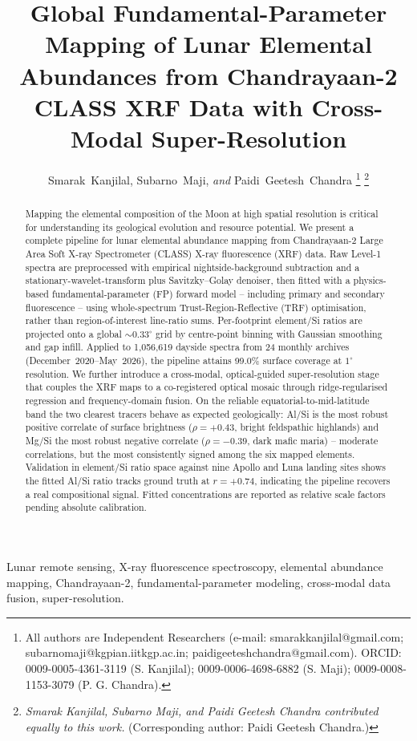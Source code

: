 \documentclass[journal,lettersize]{IEEEtran}
\title{Global Fundamental-Parameter Mapping of Lunar Elemental Abundances from Chandrayaan-2 CLASS XRF Data with Cross-Modal Super-Resolution}
\author{Smarak~Kanjilal, Subarno~Maji, \emph{and} Paidi~Geetesh~Chandra%
\thanks{All authors are Independent Researchers (e-mail: smarakkanjilal@gmail.com; subarnomaji@kgpian.iitkgp.ac.in; paidigeeteshchandra@gmail.com). ORCID: 0009-0005-4361-3119 (S. Kanjilal); 0009-0006-4698-6882 (S. Maji); 0009-0008-1153-3079 (P. G. Chandra).}%
\thanks{\textit{Smarak Kanjilal, Subarno Maji, and Paidi Geetesh Chandra contributed equally to this work.} (Corresponding author: Paidi Geetesh Chandra.)}}
\begin{document}
\maketitle

\begin{abstract}
Mapping the elemental composition of the Moon at high spatial resolution is critical for understanding its geological evolution and resource potential. We present a complete pipeline for lunar elemental abundance mapping from Chandrayaan-2 Large Area Soft X-ray Spectrometer (CLASS) X-ray fluorescence (XRF) data. Raw Level-1 spectra are preprocessed with empirical nightside-background subtraction and a stationary-wavelet-transform plus Savitzky--Golay denoiser, then fitted with a physics-based fundamental-parameter (FP) forward model -- including primary and secondary fluorescence -- using whole-spectrum Trust-Region-Reflective (TRF) optimisation, rather than region-of-interest line-ratio sums. Per-footprint element/Si ratios are projected onto a global $\sim0.33^{\circ}$ grid by centre-point binning with Gaussian smoothing and gap infill. Applied to 1{,}056{,}619 dayside spectra from 24 monthly archives (December~2020--May~2026), the pipeline attains 99.0\% surface coverage at $1^{\circ}$ resolution. We further introduce a cross-modal, optical-guided super-resolution stage that couples the XRF maps to a co-registered optical mosaic through ridge-regularised regression and frequency-domain fusion. On the reliable equatorial-to-mid-latitude band the two clearest tracers behave as expected geologically: Al/Si is the most robust positive correlate of surface brightness ($\rho=+0.43$, bright feldspathic highlands) and Mg/Si the most robust negative correlate ($\rho=-0.39$, dark mafic maria) -- moderate correlations, but the most consistently signed among the six mapped elements. Validation in element/Si ratio space against nine Apollo and Luna landing sites shows the fitted Al/Si ratio tracks ground truth at $r=+0.74$, indicating the pipeline recovers a real compositional signal. Fitted concentrations are reported as relative scale factors pending absolute calibration.
\end{abstract}

\begin{IEEEkeywords}
Lunar remote sensing, X-ray fluorescence spectroscopy, elemental abundance mapping, Chandrayaan-2, fundamental-parameter modeling, cross-modal data fusion, super-resolution.
\end{IEEEkeywords}

\end{document}
